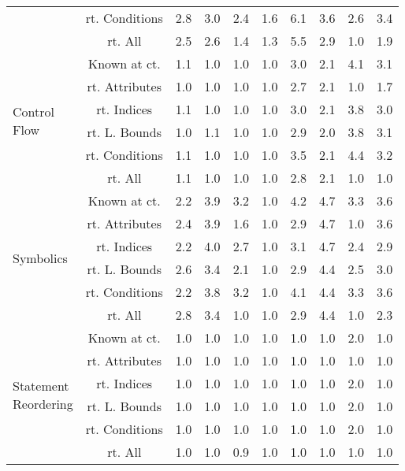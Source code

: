 \documentclass{article}
\begin{document}
\begin{longtable}{|p{2cm}|c|c|c|c|c|c|c|c|c|}
 & rt. Conditions & 2.8 & 3.0 & 2.4 & 1.6 & 6.1 & 3.6 & 2.6 & 3.4\\ \cline{2-10}
 & rt. All & 2.5 & 2.6 & 1.4 & 1.3 & 5.5 & 2.9 & 1.0 & 1.9\\ \cline{2-10}
\hline
\multirow{6}{*}{ \parbox{2cm}{Control\\Flow}} & Known at ct. & 1.1 & 1.0 & 1.0 & 1.0 & 3.0 & 2.1 & 4.1 & 3.1\\ \cline{2-10}
 & rt. Attributes & 1.0 & 1.0 & 1.0 & 1.0 & 2.7 & 2.1 & 1.0 & 1.7\\ \cline{2-10}
 & rt. Indices & 1.1 & 1.0 & 1.0 & 1.0 & 3.0 & 2.1 & 3.8 & 3.0\\ \cline{2-10}
 & rt. L. Bounds & 1.0 & 1.1 & 1.0 & 1.0 & 2.9 & 2.0 & 3.8 & 3.1\\ \cline{2-10}
 & rt. Conditions & 1.1 & 1.0 & 1.0 & 1.0 & 3.5 & 2.1 & 4.4 & 3.2\\ \cline{2-10}
 & rt. All & 1.1 & 1.0 & 1.0 & 1.0 & 2.8 & 2.1 & 1.0 & 1.0\\ \cline{2-10}
\hline
\multirow{6}{*}{ \parbox{2cm}{Symbolics}} & Known at ct. & 2.2 & 3.9 & 3.2 & 1.0 & 4.2 & 4.7 & 3.3 & 3.6\\ \cline{2-10}
 & rt. Attributes & 2.4 & 3.9 & 1.6 & 1.0 & 2.9 & 4.7 & 1.0 & 3.6\\ \cline{2-10}
 & rt. Indices & 2.2 & 4.0 & 2.7 & 1.0 & 3.1 & 4.7 & 2.4 & 2.9\\ \cline{2-10}
 & rt. L. Bounds & 2.6 & 3.4 & 2.1 & 1.0 & 2.9 & 4.4 & 2.5 & 3.0\\ \cline{2-10}
 & rt. Conditions & 2.2 & 3.8 & 3.2 & 1.0 & 4.1 & 4.4 & 3.3 & 3.6\\ \cline{2-10}
 & rt. All & 2.8 & 3.4 & 1.0 & 1.0 & 2.9 & 4.4 & 1.0 & 2.3\\ \cline{2-10}
\hline
\multirow{6}{*}{ \parbox{2cm}{Statement\\Reordering}} & Known at ct. & 1.0 & 1.0 & 1.0 & 1.0 & 1.0 & 1.0 & 2.0 & 1.0\\ \cline{2-10}
 & rt. Attributes & 1.0 & 1.0 & 1.0 & 1.0 & 1.0 & 1.0 & 1.0 & 1.0\\ \cline{2-10}
 & rt. Indices & 1.0 & 1.0 & 1.0 & 1.0 & 1.0 & 1.0 & 2.0 & 1.0\\ \cline{2-10}
 & rt. L. Bounds & 1.0 & 1.0 & 1.0 & 1.0 & 1.0 & 1.0 & 2.0 & 1.0\\ \cline{2-10}
 & rt. Conditions & 1.0 & 1.0 & 1.0 & 1.0 & 1.0 & 1.0 & 2.0 & 1.0\\ \cline{2-10}
 & rt. All & 1.0 & 1.0 & 0.9 & 1.0 & 1.0 & 1.0 & 1.0 & 1.0\\ \cline{2-10}

\end{longtable}
\end{document}
